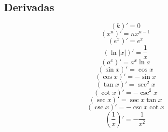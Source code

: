 \documentclass[a4paper,12pt,numbers=noenddot]{scrreprt}
\begin{document}
\subsection*{Derivadas}
    \begin{multicols}{2}
        \begin{equation*}
            (k)' = 0
        \end{equation*}
        \begin{equation*}
            (x^n)' = nx^{n-1}
        \end{equation*}
        \begin{equation*}
            (e^x)' = e^x
        \end{equation*}
        \begin{equation*}
            (\ln |x|)' = \frac{1}{x}
        \end{equation*}
        \begin{equation*}
            (a^x)' = a^x \ln a
        \end{equation*}
        \begin{equation*}
            (\sin x)' = \cos x
        \end{equation*}
        \begin{equation*}
            (\cos x)' = -\sin x
        \end{equation*}
        \begin{equation*}
            (\tan x)' = \sec^2 x
        \end{equation*}
        \begin{equation*}
            (\cot x)' = -\csc^2 x
        \end{equation*}
        \begin{equation*}
            (\sec x)' = \sec x \tan x
        \end{equation*}
        \begin{equation*}
            (\csc x)' = -\csc x \cot x
        \end{equation*}
        \begin{equation*}
            (\frac{1}{x})' = -\frac{1}{x^2}
        \end{equation*} 
    \end{multicols}
\end{document}
